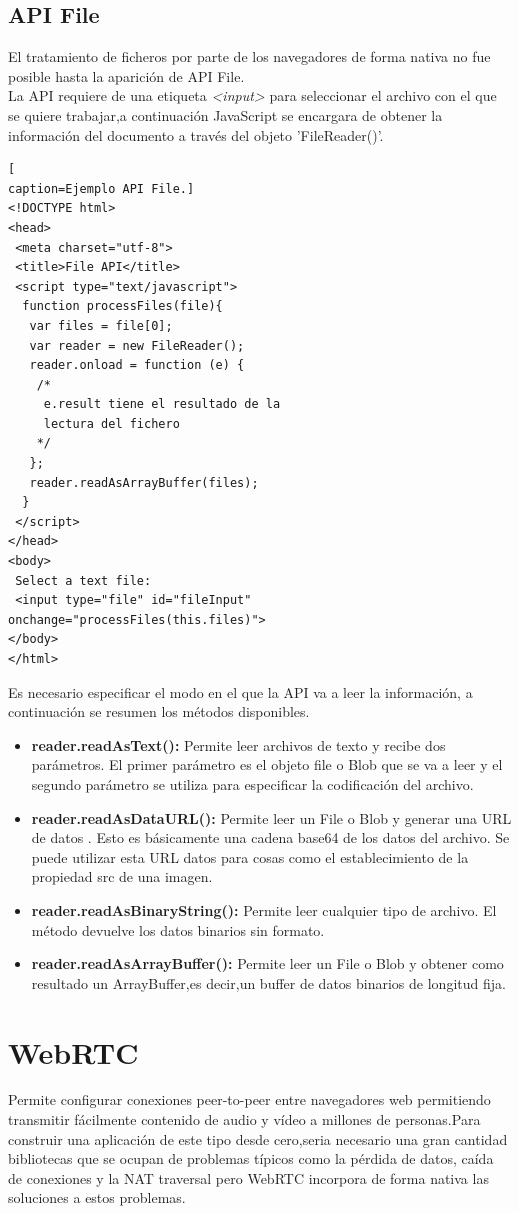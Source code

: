 \subsection{API File}
El tratamiento de ficheros por parte de los navegadores de forma nativa no fue posible hasta la aparición de API File\cite{APIFile}.
\\La API requiere de una etiqueta \textit{<input>} para seleccionar el archivo con el que se quiere trabajar,a continuación JavaScript se encargara de obtener la información del documento a través del objeto 'FileReader()'.
\begin{lstlisting}[
caption=Ejemplo API File.]
<!DOCTYPE html>
<head>
 <meta charset="utf-8">
 <title>File API</title>
 <script type="text/javascript">
  function processFiles(file){
   var files = file[0];
   var reader = new FileReader();
   reader.onload = function (e) {
    /*
     e.result tiene el resultado de la 
     lectura del fichero
    */
   };
   reader.readAsArrayBuffer(files);
  }
 </script>
</head>
<body>
 Select a text file:
 <input type="file" id="fileInput" onchange="processFiles(this.files)">
</body>
</html>
\end{lstlisting}
Es necesario especificar el modo en el que la API va a leer la información, a continuación se resumen los métodos disponibles.
\begin{itemize}
\item \textbf{reader.readAsText():} Permite leer archivos de texto y recibe dos parámetros. El primer parámetro es el objeto file o Blob que se va a leer y el segundo parámetro se utiliza para especificar la codificación del archivo.
\item \textbf{reader.readAsDataURL():} Permite leer un File o Blob y generar una URL de datos . Esto es básicamente una cadena base64 de los datos del archivo. Se puede utilizar esta URL datos para cosas como el establecimiento de la propiedad src de una imagen.
\item \textbf{reader.readAsBinaryString():} Permite leer cualquier tipo de archivo. El método devuelve los datos binarios sin formato.
\item \textbf{reader.readAsArrayBuffer():} Permite leer un File o Blob y obtener como resultado un ArrayBuffer,es decir,un buffer de datos binarios de longitud fija.
\end{itemize}
\section{WebRTC}
Permite configurar conexiones peer-to-peer entre navegadores web permitiendo transmitir fácilmente contenido de audio y vídeo a millones de personas.Para construir una aplicación de este tipo desde cero,seria necesario una gran cantidad bibliotecas que se ocupan de problemas típicos como la pérdida de datos, caída de conexiones y la NAT traversal pero WebRTC\cite{webRTC} incorpora de forma nativa las soluciones a estos problemas.
